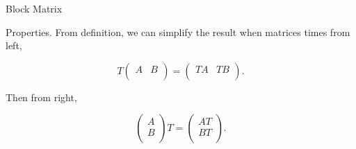 \documentclass[hyperref={pdfpagelabels=true}]{beamer}
\newcommand{\<}{\langle}
\renewcommand{\>}{\rangle}
\begin{document}
\begin{frame}{Block Matrix}
    \begin{block}{Properties.}
        From definition, we can simplify the result when matrices times from left,
        \begin{spacing}{0.7}
        \[T
        \begin{pmatrix}
           A & B\\
        \end{pmatrix} = 
        \begin{pmatrix}
            TA & TB\\
        \end{pmatrix}.
        \]
    \end{spacing}
        Then from right,
        \begin{spacing}{0.7}
        \[
            \begin{pmatrix}
                A\\
                B\\
            \end{pmatrix}
            T = 
            \begin{pmatrix}
                AT\\
                BT\\
            \end{pmatrix}.
        \]
        \end{spacing}
    \end{block}
\end{frame}
\end{document}
